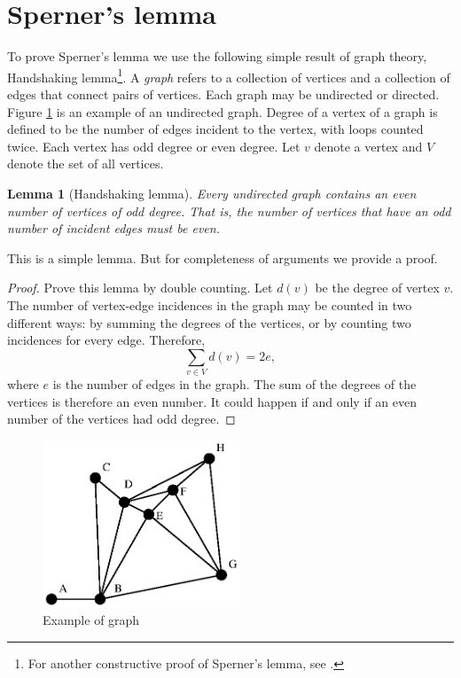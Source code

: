 \documentclass[reqno]{amsart}
\newtheorem{lem}{Lemma}
\begin{document}
\section{Sperner's lemma}\label{sec2}
To prove Sperner's lemma we use the following simple result of graph theory, Handshaking lemma\footnote{For another constructive proof of Sperner's lemma, see \cite{su}. }. A \emph{graph} refers to a collection of vertices and a collection of edges that connect pairs of vertices. Each graph may be undirected or directed. Figure \ref{graph} is an example of an undirected graph. Degree of a vertex of a graph is defined to be the number of edges incident to the vertex, with loops counted twice. Each vertex has odd degree or even degree. Let $v$ denote a vertex and $V$ denote the set of all vertices.
\begin{lem}[Handshaking lemma]
Every undirected graph contains an even number of vertices of odd degree. That is, the number of vertices that have an odd number of incident edges must be even.
\end{lem}
This is a simple lemma. But for completeness of arguments we provide a proof.
\begin{proof}
Prove this lemma by double counting. Let $d(v)$ be the degree of vertex $v$. The number of vertex-edge incidences in the graph may be counted in two different ways: by summing the degrees of the vertices, or by counting two incidences for every edge. Therefore,
\[\sum_{v\in V}d(v)=2e,\]
where $e$ is the number of edges in the graph. The sum of the degrees of the vertices is therefore an even number. It could happen if and only if an even number of the vertices had odd degree.

\end{proof}


\begin{figure}[ptb]
\begin{center}
\includegraphics[height=5cm]{br-non1.eps}
\end{center}
	\vspace*{-.3cm}
	\caption{Example of graph}
	\label{graph}
\end{figure}
\end{document}
